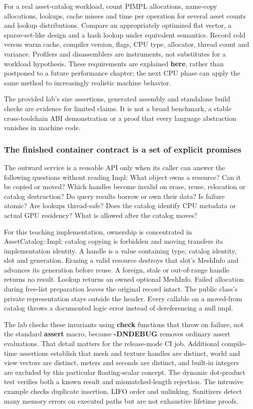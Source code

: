 For a real asset-catalog workload, count PIMPL allocations, name-copy allocations, lookups, cache misses and time per operation for several asset counts and lookup distributions. Compare an appropriately optimized flat vector, a sparse-set-like design and a hash lookup under equivalent semantics. Record cold versus warm cache, compiler version, flags, CPU type, allocator, thread count and variance. Profilers and disassemblers are instruments, not substitutes for a workload hypothesis. These requirements are explained \textbf{here}, rather than postponed to a future performance chapter; the next CPU phase can apply the same method to increasingly realistic machine behavior.

The provided lab's size assertions, generated assembly and standalone build checks are evidence for limited claims. It is not a broad benchmark, a stable cross-toolchain ABI demonstration or a proof that every language abstraction vanishes in machine code.

\subsubsection{The finished container contract is a set of explicit promises}\label{the-finished-container-contract-is-a-set-of-explicit-promises}

The outward service is a reusable API only when its caller can answer the following questions without reading Impl: What object owns a resource? Can it be copied or moved? Which handles become invalid on erase, reuse, relocation or catalog destruction? Do query results borrow or own their data? Is failure atomic? Are lookups thread-safe? Does the catalog identify CPU metadata or actual GPU residency? What is allowed after the catalog moves?

For this teaching implementation, ownership is concentrated in AssetCatalog::Impl; catalog copying is forbidden and moving transfers its implementation identity. A handle is a value containing type, catalog identity, slot and generation. Erasing a valid resource destroys that slot's MeshInfo and advances its generation before reuse. A foreign, stale or out-of-range handle returns no result. Lookup returns an owned optional MeshInfo. Failed allocation during free-list preparation leaves the original record intact. The public class's private representation stays outside the header. Every callable on a moved-from catalog throws a documented logic error instead of dereferencing a null impl.

The lab checks these invariants using \textbf{check} functions that throw on failure, not the standard \textbf{assert} macro, because \textbf{-DNDEBUG} removes ordinary assert evaluations. That detail matters for the release-mode CI job. Additional compile-time assertions establish that mesh and texture handles are distinct, world and view vectors are distinct, meters and seconds are distinct, and built-in integers are excluded by this particular floating-scalar concept. The dynamic dot-product test verifies both a known result and mismatched-length rejection. The intrusive example checks duplicate insertion, LIFO order and unlinking. Sanitizers detect many memory errors on executed paths but are not exhaustive lifetime proofs.

